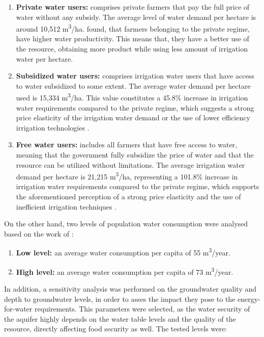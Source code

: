 \begin{enumerate}
	\item \textbf{Private water users:} comprises private farmers that pay the full price of water without any subsidy. The average level of water demand per hectare is around 10,512 m\textsuperscript{3}/ha. \citet{Socioeconomicaspectsirrigation2014} found, that farmers belonging to the private regime, have higher water productivity. This means that, they have a better use of the resource, obtaining more product while using less amount of irrigation water per hectare.
	\item \textbf{Subsidized water users:} comprises irrigation water users that have access to water subsidized to some extent. The average water demand per hectare used is 15,334 m\textsuperscript{3}/ha. This value constitutes a 45.8\% increase in irrigation water requirements compared to the private regime, which suggests a strong price elasticity of the irrigation water demand or the use of lower efficiency irrigation technologies \cite{Socioeconomicaspectsirrigation2014}.
	\item \textbf{Free water users:} includes all farmers that have free access to water, meaning that the government fully subsidize the price of water and that the resource can be utilized without limitations. The average irrigation water demand per hectare is 21,215 m\textsuperscript{3}/ha, representing a 101.8\% increase in irrigation water requirements compared to the private regime, which supports the aforementioned perception of a strong price elasticity and the use of inefficient irrigation techniques \cite{Socioeconomicaspectsirrigation2014}.
\end{enumerate}

On the other hand, two levels of population water consumption were analysed based on the work of \citet{Householdwaterconsumption2014}:

\begin{enumerate}
    \item \textbf{Low level:} an average water consumption per capita of 55 m\textsuperscript{3}/year.
    \item \textbf{High level:} an average water consumption per capita of 73 m\textsuperscript{3}/year.
\end{enumerate}

In addition, a sensitivity analysis was performed on the groundwater quality and depth to groundwater levels, in order to asses the impact they pose to the energy-for-water requirements. This parameters were selected, as the water security of the aquifer highly depends on the water table levels and the quality of the resource, directly affecting food security as well. The tested levels were:

